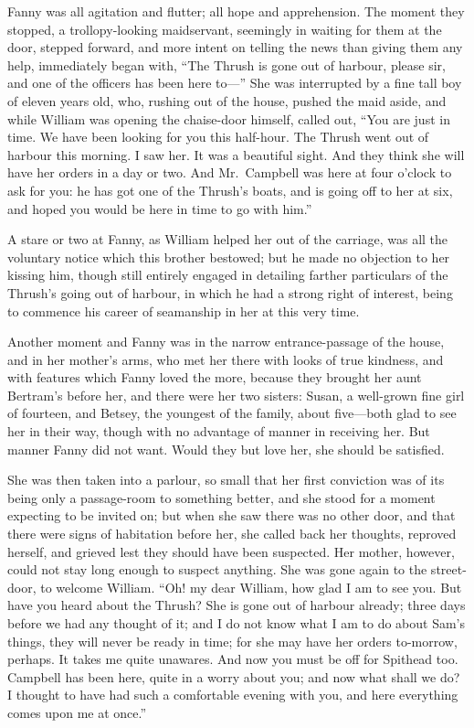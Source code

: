 \documentclass{article}
\begin{document}
Fanny was all agitation and flutter; all hope and apprehension.
The moment they stopped, a trollopy-looking maidservant,
seemingly in waiting for them at the door, stepped forward,
and more intent on telling the news than giving them any help,
immediately began with, ``The Thrush is gone out of harbour,
please sir, and one of the officers has been here to---''
She was interrupted by a fine tall boy of eleven years old,
who, rushing out of the house, pushed the maid aside,
and while William was opening the chaise-door himself,
called out, ``You are just in time.  We have been looking
for you this half-hour. The Thrush went out of harbour
this morning.  I saw her.  It was a beautiful sight.
And they think she will have her orders in a day or two.
And Mr.\ Campbell was here at four o'clock to ask for you:
he has got one of the Thrush's boats, and is going off
to her at six, and hoped you would be here in time to go
with him.''

A stare or two at Fanny, as William helped her out of
the carriage, was all the voluntary notice which this
brother bestowed; but he made no objection to her
kissing him, though still entirely engaged in detailing
farther particulars of the Thrush's going out of harbour,
in which he had a strong right of interest, being to
commence his career of seamanship in her at this very time.

Another moment and Fanny was in the narrow entrance-passage
of the house, and in her mother's arms, who met her
there with looks of true kindness, and with features
which Fanny loved the more, because they brought her aunt
Bertram's before her, and there were her two sisters:
Susan, a well-grown fine girl of fourteen, and Betsey,
the youngest of the family, about five---both glad to see
her in their way, though with no advantage of manner
in receiving her.  But manner Fanny did not want.
Would they but love her, she should be satisfied.

She was then taken into a parlour, so small that her
first conviction was of its being only a passage-room
to something better, and she stood for a moment expecting
to be invited on; but when she saw there was no other door,
and that there were signs of habitation before her,
she called back her thoughts, reproved herself, and grieved
lest they should have been suspected.  Her mother,
however, could not stay long enough to suspect anything.
She was gone again to the street-door, to welcome William.
``Oh! my dear William, how glad I am to see you.
But have you heard about the Thrush?  She is gone out of
harbour already; three days before we had any thought of it;
and I do not know what I am to do about Sam's things,
they will never be ready in time; for she may have her orders
to-morrow, perhaps.  It takes me quite unawares.  And now
you must be off for Spithead too.  Campbell has been here,
quite in a worry about you; and now what shall we do?
I thought to have had such a comfortable evening with you,
and here everything comes upon me at once.''
\end{document}
